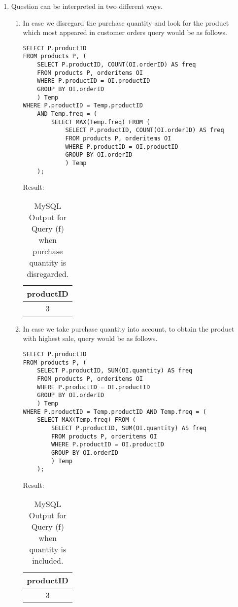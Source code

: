 \begin{enumerate}[label=(\alph*)]
\item Question can be interpreted in two different ways.
\begin{enumerate}[label=(\arabic*)]
\item In case we disregard the purchase quantity and look for the product which most appeared in customer orders query would be as follows.
\begin{lstlisting}
SELECT P.productID
FROM products P, (
	SELECT P.productID, COUNT(OI.orderID) AS freq
	FROM products P, orderitems OI
	WHERE P.productID = OI.productID
	GROUP BY OI.orderID
	) Temp
WHERE P.productID = Temp.productID
	AND Temp.freq = (
		SELECT MAX(Temp.freq) FROM (
			SELECT P.productID, COUNT(OI.orderID) AS freq
			FROM products P, orderitems OI
			WHERE P.productID = OI.productID
			GROUP BY OI.orderID	
			) Temp
	);
\end{lstlisting}
Result:
\begin{table}[H]\centering
\begin{tabular}{|c|}
\hline
productID\\
\hline
3\\
\hline
\end{tabular}
\caption{MySQL Output for Query (f) when purchase quantity is disregarded.}\label{tab34}
\end{table}

\item In case we take purchase quantity into account, to obtain the product with highest sale, query would be as follows.

\begin{lstlisting}
SELECT P.productID
FROM products P, (
	SELECT P.productID, SUM(OI.quantity) AS freq
	FROM products P, orderitems OI
	WHERE P.productID = OI.productID
	GROUP BY OI.orderID
	) Temp
WHERE P.productID = Temp.productID AND Temp.freq = (
	SELECT MAX(Temp.freq) FROM (
		SELECT P.productID, SUM(OI.quantity) AS freq
		FROM products P, orderitems OI
		WHERE P.productID = OI.productID
		GROUP BY OI.orderID 
		) Temp
	);
\end{lstlisting}
Result:
\begin{table}[H]\centering
\begin{tabular}{|c|}
\hline
productID\\
\hline
3\\
\hline
\end{tabular}
\caption{MySQL Output for Query (f) when quantity is included.}\label{tab35}
\end{table}
\end{enumerate}
\end{enumerate}
